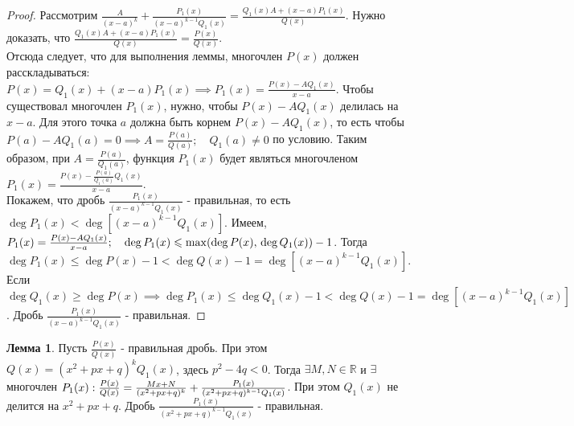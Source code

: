 \documentclass{report}
\theoremstyle{definition}
\newtheorem{lemma}{Лемма}[section]
\begin{document}
\begin{proof}
  Рассмотрим $\frac{A}{(x - a)^{k}} + \frac{P_{1}(x)}{(x - a)^{k-1}Q_{1}(x)} = \frac{Q_{1}(x)A +
      (x-a)P_{1}(x)}{Q(x)}$. Нужно доказать, что $\frac{Q_{1}(x)A + (x-a)P_{1}(x)}{Q(x)} = \frac{P(x)}{Q(x)}$.\\

  Отсюда следует, что для выполнения леммы, многочлен $P(x)$ должен расскладываться: $P(x) = Q_{1}(x) +
    (x-a)P_{1}(x) \implies P_{1}(x) = \frac{P(x) - AQ_{1}(x)}{x - a}$. Чтобы существовал многочлен $P_{1}(x)$,
  нужно, чтобы $P(x) - AQ_{1}(x)$ делилась на $x - a$. Для этого точка $a$ должна быть корнем $P(x) - AQ_{1}(x)$,
  то есть чтобы $P(a) - AQ_{1}(a) = 0 \implies A = \frac{P(a)}{Q(a)}; \quad Q_{1}(a) \ne 0$ по условию.
  Таким образом, при $A = \frac{P(a)}{Q_{1}(a)}$, функция $P_{1}(x)$ будет являться многочленом
  $P_{1}(x) = \frac{P(x) - \frac{P(a)}{Q_{1}(a)}Q_{1}(x)}{x-a}$. \\

  Покажем, что дробь $\frac{P_{1}(x)}{(x-a)^{k-1}Q_{1}(x)}$ - правильная, то есть $\deg P_{1}(x) <
    \deg[(x-a)^{k-1}Q_{1}(x)]$. Имеем, $P_{1}(x) = \frac{P(x) - AQ_{1}(x)}{x-a}; \quad \deg P_{1}(x)
    \leqslant \max(\deg P(x), \\ \deg Q_{1}(x)) - 1$. Тогда $\deg P_{1}(x) \leqslant \deg P(x) - 1 <
    \deg Q(x) - 1 = \deg[(x-a)^{k-1}Q_{1}(x)]$. \\

  Если $\deg Q_{1}(x) \geqslant \deg P(x) \implies \deg P_{1}(x) \leqslant \deg Q_{1}(x) - 1 < \deg Q(x) - 1 =
    \deg [(x-a)^{k-1}Q_{1}(x)]$. Дробь $\frac{P_{1}(x)}{(x - a)^{k-1}Q_{1}(x)}$ - правильная.
\end{proof}

\begin{lemma}
  Пусть $\frac{P(x)}{Q(x)}$ - правильная дробь. При этом $Q(x) = (x^{2} + px + q)^{k} Q_{1}(x)$, здесь
  $p^{2} - 4q < 0$. Тогда $\exists M, N \in \mathbb{R}$ и $\exists$ многочлен $P_{1}(x): \\
    \frac{P(x)}{Q(x)} = \frac{Mx + N}{(x^{2} + px + q)^{k}} + \frac{P_{1}(x)}{(x^{2} + px + q)^{k-1}Q_{1}(x)}$.
  При этом $Q_{1}(x)$ не делится на $x^{2} + px + q$. Дробь $\frac{P_{1}(x)}{(x^{2} + px + q)^{k-1}Q_{1}(x)}$
  - правильная.
\end{lemma}
\end{document}
